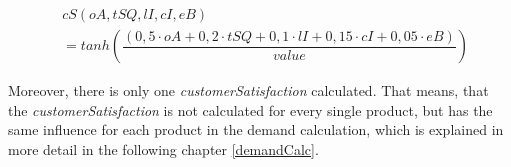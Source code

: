 \begin{equation}
\begin{aligned}
\label{cSCalc}
    & cS(oA, tSQ, lI, cI, eB) \\
    & = tanh(\dfrac{(0,5 \cdot oA + 0,2 \cdot tSQ + 0,1 \cdot lI + 0,15 \cdot cI + 0,05 \cdot eB)}{value}) %
\end{aligned}    
\end{equation}

Moreover, there is only one \textit{customerSatisfaction} calculated. That means, that the \textit{customerSatisfaction} is not calculated for every single product, but has the same influence for each product in the demand calculation, which is explained in more detail in the following chapter \ref{demandCalc}.

